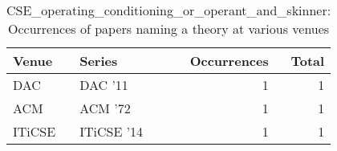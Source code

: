\begin{table*}[t]
\begin{tabular}{llrr}
Venue & Series & Occurrences & Total\\\hline
\multirow{1}{*}{DAC } & DAC '11 & 1 & \multirow{1}{*}{1}\\
\multirow{1}{*}{ACM } & ACM '72 & 1 & \multirow{1}{*}{1}\\
\multirow{1}{*}{ITiCSE } & ITiCSE '14 & 1 & \multirow{1}{*}{1}\\
\end{tabular}
\caption{CSE\_operating\_conditioning\_or\_operant\_and\_skinner: Occurrences of papers naming a theory at various venues}
\end{table*}